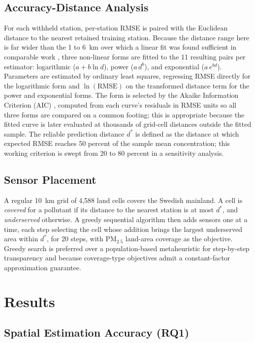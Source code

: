 \documentclass[conference]{IEEEtran}
\begin{document}
\subsection{Accuracy-Distance Analysis}

For each withheld station, per-station RMSE is paired with the Euclidean
distance to the nearest retained training station. Because the distance range
here is far wider than the 1 to 6~km over which a linear fit was found
sufficient in comparable work \cite{zhivkov_fidanova_2026}, three non-linear
forms are fitted to the 11 resulting pairs per estimator: logarithmic
($a + b\ln d$), power ($a\,d^{b}$), and exponential ($a\,e^{bd}$). Parameters
are estimated by ordinary least squares, regressing RMSE directly for the
logarithmic form and $\ln(\mathrm{RMSE})$ on the transformed distance term
for the power and exponential forms. The form is selected by the Akaike
Information Criterion (AIC) \cite{akaike_1974}, computed from each curve's
residuals in RMSE units so all three forms are compared on a common footing;
this is appropriate because the fitted curve is later evaluated at thousands
of grid-cell distances outside the fitted sample. The reliable prediction
distance $d^{*}$ is defined as the distance at which expected RMSE reaches 50
percent of the sample mean concentration; this working criterion is swept
from 20 to 80 percent in a sensitivity analysis.

\subsection{Sensor Placement}

A regular 10~km grid of 4{,}588 land cells covers the Swedish mainland. A cell
is \textit{covered} for a pollutant if its distance to the nearest station is
at most $d^{*}$, and \textit{underserved} otherwise. A greedy sequential
algorithm then adds sensors one at a time, each step selecting the cell whose
addition brings the largest underserved area within $d^{*}$, for 20 steps,
with PM$_{2.5}$ land-area coverage as the objective. Greedy search is
preferred over a population-based metaheuristic for step-by-step transparency
and because coverage-type objectives admit a constant-factor approximation
guarantee.

\section{Results}
\label{sec:results}

\subsection{Spatial Estimation Accuracy (RQ1)}
\label{sec:results-rq1}
\end{document}
